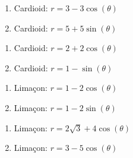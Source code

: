 \documentclass{ximera}
\begin{document}
\begin{multicols}{2} 

\begin{enumerate}

\setcounter{enumi}{\value{HW}}

\item Cardioid: $r = 3 - 3\cos(\theta)$ 
\item Cardioid: $r = 5 + 5\sin(\theta)$ 

\setcounter{HW}{\value{enumi}}

\end{enumerate}

\end{multicols}

\begin{multicols}{2} 

\begin{enumerate}

\setcounter{enumi}{\value{HW}}

\item Cardioid: $r = 2 + 2\cos(\theta)$ 
\item Cardioid: $r = 1 - \sin(\theta)$ 

\setcounter{HW}{\value{enumi}}

\end{enumerate}

\end{multicols}

\begin{multicols}{2} 

\begin{enumerate}

\setcounter{enumi}{\value{HW}}

\item Lima\c{c}on: $r = 1 - 2\cos(\theta)$ 
\item Lima\c{c}on: $r = 1 - 2\sin(\theta)$ 

\setcounter{HW}{\value{enumi}}

\end{enumerate}

\end{multicols}

\begin{multicols}{2} 

\begin{enumerate}

\setcounter{enumi}{\value{HW}}

\item Lima\c{c}on: $r = 2\sqrt{3} + 4\cos(\theta)$ 
\item Lima\c{c}on: $r = 3-5\cos(\theta)$

\setcounter{HW}{\value{enumi}}

\end{enumerate}

\end{multicols}
\end{document}
